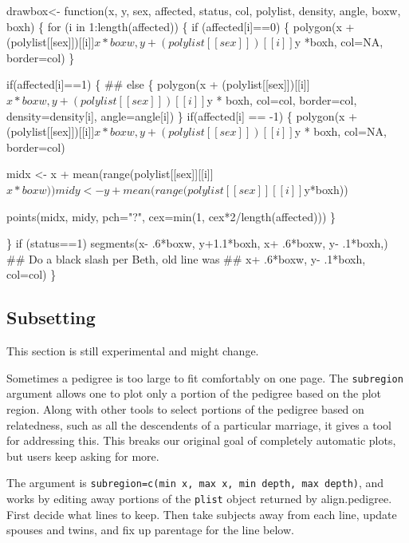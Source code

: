\documentclass{article}
\begin{document}
\begin{enumerate}
\nwenddocs{}\plusendmoddef

  drawbox<- function(x, y, sex, affected, status, col, polylist,
            density, angle, boxw, boxh) \{
        for (i in 1:length(affected)) \{
            if (affected[i]==0) \{
                polygon(x + (polylist[[sex]])[[i]]$x *boxw,
                        y + (polylist[[sex]])[[i]]$y *boxh,
                        col=NA, border=col)
                \}
            
            if(affected[i]==1) \{
              ## else \{
              polygon(x + (polylist[[sex]])[[i]]$x * boxw,
                      y + (polylist[[sex]])[[i]]$y * boxh,
                      col=col, border=col, density=density[i], angle=angle[i])            
            \}
            if(affected[i] == -1) \{
              polygon(x + (polylist[[sex]])[[i]]$x * boxw,
                      y + (polylist[[sex]])[[i]]$y * boxh,
                      col=NA, border=col)
              
              midx <- x + mean(range(polylist[[sex]][[i]]$x*boxw))
              midy <- y + mean(range(polylist[[sex]][[i]]$y*boxh))
             
              points(midx, midy, pch="?", cex=min(1, cex*2/length(affected)))
            \}
            
          \}
        if (status==1) segments(x- .6*boxw, y+1.1*boxh, 
                                x+ .6*boxw, y- .1*boxh,)
        ## Do a black slash per Beth, old line was
        ##        x+ .6*boxw, y- .1*boxh, col=col)
      \}

\nwendcode{}\nwdocspar

\subsection{Subsetting}
This section is still experimental and might change.  

Sometimes a pedigree is too large to fit comfortably on one page.
The {\tt{}subregion} argument allows one to plot only a portion of the
pedigree based on the plot region.  Along with other tools to
select portions of the pedigree based on relatedness, such as all
the descendents of a particular marriage, it gives a tool for
addressing this.  This breaks our original goal of completely
automatic plots, but users keep asking for more.

The argument is {\tt{}subregion=c(min\ x,\ max\ x,\ min\ depth,\ max\ depth)},
and works by editing away portions of the {\tt{}plist} object
returned by align.pedigree. 
First decide what lines to keep. 
Then take subjects away from each line, 
update spouses and twins,
and fix up parentage for the line below.


\end{enumerate}
\end{document}
